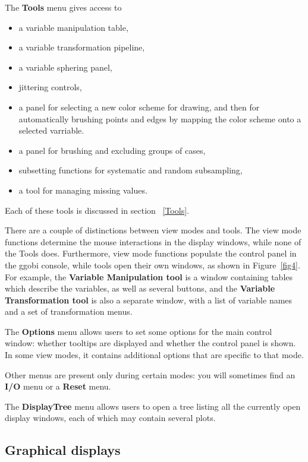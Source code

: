 \documentclass[11pt]{article}
\begin{document}
The {\bf Tools} menu gives access to 
\begin{itemize}
\itemsep 0em
\item a variable manipulation table,
\item a variable transformation pipeline,
\item a variable sphering panel,
\item jittering controls,
\item a panel for selecting a new color scheme for drawing, and
 then for automatically brushing points and edges by mapping the
 color scheme onto a selected varriable.
\item a panel for brushing and excluding groups of cases,
\item subsetting functions for systematic and random subsampling, 
\item a tool for managing missing values.
\end{itemize}

Each of these tools is discussed in section ~\ref{Tools}.

There are a couple of distinctions between view modes and tools.  The
view mode functions determine the mouse interactions in the display
windows, while none of the Tools does.  Furthermore, view mode
functions populate the control panel in the ggobi console, while
tools open their own windows, as shown in Figure~\ref{fig4}.  For
example, the {\bf Variable Manipulation tool} is a window containing
tables which describe the variables, as well as several buttons,
and the {\bf Variable Transformation tool} is also a separate window,
with a list of variable names and a set of transformation menus.

The {\bf Options} menu allows users to set some options for the main
control window:  whether tooltips are displayed and whether the
control panel is shown.  In some view modes, it contains additional
options that are specific to that mode.

Other menus are present only during certain modes:  you will
sometimes find an {\bf I/O} menu or a {\bf Reset} menu.

The {\bf DisplayTree} menu allows users to open a tree listing
all the currently open display windows, each of which may contain
several plots.

\subsection{Graphical displays}
\label{slbl:GraphicalDisplays}
\end{document}
